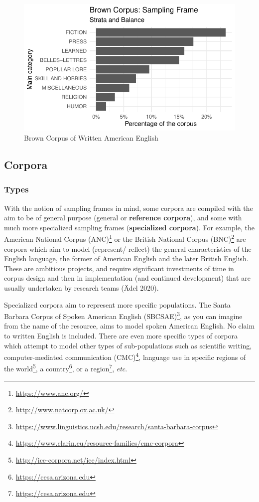 \documentclass[
  letterpaper,
]{scrbook}
\DeclareRobustCommand{\href}[2]{#2\footnote{\url{#1}}}
\begin{document}
\begin{figure}[h]

{\centering \includegraphics{./understanding-data_files/figure-pdf/fig-brown-distribution-1.pdf}

}

\caption{\label{fig-brown-distribution}Brown Corpus of Written American
English}

\end{figure}

\hypertarget{corpora}{%
\subsection{Corpora}\label{corpora}}

\hypertarget{types}{%
\subsubsection{Types}\label{types}}

With the notion of sampling frames in mind, some corpora are compiled
with the aim to be of general purpose (general or \textbf{reference
corpora}), and some with much more specialized sampling frames
(\textbf{specialized corpora}). For example, the
\href{https://www.anc.org/}{American National Corpus (ANC)} or the
\href{http://www.natcorp.ox.ac.uk/}{British National Corpus (BNC)} are
corpora which aim to model (represent/ reflect) the general
characteristics of the English language, the former of American English
and the later British English. These are ambitious projects, and require
significant investments of time in corpus design and then in
implementation (and continued development) that are usually undertaken
by research teams (Ädel 2020).

Specialized corpora aim to represent more specific populations. The
\href{https://www.linguistics.ucsb.edu/research/santa-barbara-corpus}{Santa
Barbara Corpus of Spoken American English (SBCSAE)}, as you can imagine
from the name of the resource, aims to model spoken American English. No
claim to written English is included. There are even more specific types
of corpora which attempt to model other types of sub-populations such as
scientific writing,
\href{https://www.clarin.eu/resource-families/cmc-corpora}{computer-mediated
communication (CMC)}, language use in specific
\href{http://ice-corpora.net/ice/index.html}{regions of the world}, a
\href{https://cesa.arizona.edu}{country}, or a
\href{https://cesa.arizona.edu}{region}, \emph{etc}.
\end{document}
